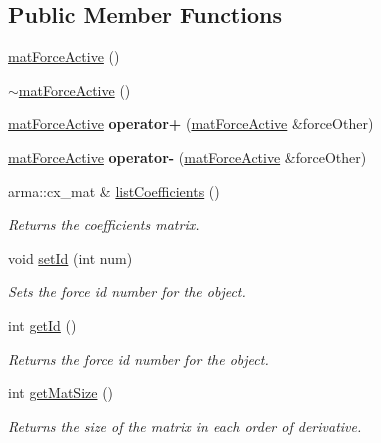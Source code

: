 \subsection*{Public Member Functions}
\begin{DoxyCompactItemize}
\item 
\hyperlink{classosea_1_1ofreq_1_1mat_force_active_addc507c90f98f3a9bb9bfe57897df3ca}{mat\-Force\-Active} ()
\item 
\hyperlink{classosea_1_1ofreq_1_1mat_force_active_aba1957829e2109f03c6fc03990258210}{$\sim$mat\-Force\-Active} ()
\item 
\hypertarget{classosea_1_1ofreq_1_1mat_force_active_a8bc32fc773bd6c29d8bd7790194a10cf}{\hyperlink{classosea_1_1ofreq_1_1mat_force_active}{mat\-Force\-Active} {\bfseries operator+} (\hyperlink{classosea_1_1ofreq_1_1mat_force_active}{mat\-Force\-Active} \&force\-Other)}\label{classosea_1_1ofreq_1_1mat_force_active_a8bc32fc773bd6c29d8bd7790194a10cf}

\item 
\hypertarget{classosea_1_1ofreq_1_1mat_force_active_a150bda87debf622dacb439e8e983fa3c}{\hyperlink{classosea_1_1ofreq_1_1mat_force_active}{mat\-Force\-Active} {\bfseries operator-\/} (\hyperlink{classosea_1_1ofreq_1_1mat_force_active}{mat\-Force\-Active} \&force\-Other)}\label{classosea_1_1ofreq_1_1mat_force_active_a150bda87debf622dacb439e8e983fa3c}

\item 
arma\-::cx\-\_\-mat \& \hyperlink{classosea_1_1ofreq_1_1mat_force_active_a34d3cedfef07d6136bab26988ffc7905}{list\-Coefficients} ()
\begin{DoxyCompactList}\small\item\em Returns the coefficients matrix. \end{DoxyCompactList}\item 
void \hyperlink{classosea_1_1ofreq_1_1mat_force_active_a2784051c78388741bf1cf66d18df0b2c}{set\-Id} (int num)
\begin{DoxyCompactList}\small\item\em Sets the force id number for the object. \end{DoxyCompactList}\item 
int \hyperlink{classosea_1_1ofreq_1_1mat_force_active_a48a33b65af2085268a2f03fb212a39d3}{get\-Id} ()
\begin{DoxyCompactList}\small\item\em Returns the force id number for the object. \end{DoxyCompactList}\item 
int \hyperlink{classosea_1_1ofreq_1_1mat_force_active_aa17a21eb9a9ea9e1a36fae4dbc2b09bf}{get\-Mat\-Size} ()
\begin{DoxyCompactList}\small\item\em Returns the size of the matrix in each order of derivative. \end{DoxyCompactList}\end{DoxyCompactItemize}
